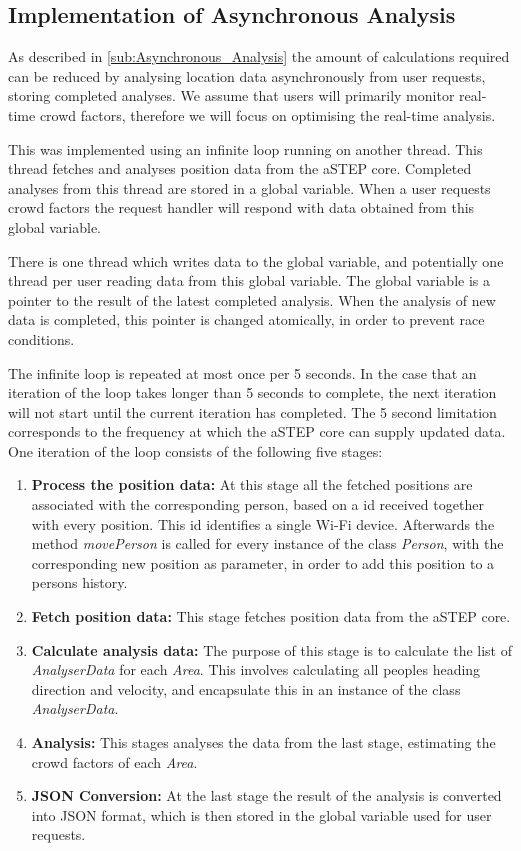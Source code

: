 \subsection{Implementation of Asynchronous Analysis}
\label{sub:implementation_of_asynchronous_analysis}

As described in \cref{sub:Asynchronous_Analysis} the amount of calculations required can be reduced by analysing location data asynchronously from user requests, storing completed analyses. We assume that users will primarily monitor real-time crowd factors, therefore we will focus on optimising the real-time analysis.

This was implemented using an infinite loop running on another thread. This thread fetches and analyses position data from the aSTEP core. Completed analyses from this thread are stored in a global variable. When a user requests crowd factors the request handler will respond with data obtained from this global variable. 

There is one thread which writes data to the global variable, and potentially one thread per user reading data from this global variable. The global variable is a pointer to the result of the latest completed analysis. When the analysis of new data is completed, this pointer is changed atomically, in order to prevent race conditions. 

The infinite loop is repeated at most once per 5 seconds. In the case that an iteration of the loop takes longer than 5 seconds to complete, the next iteration will not start until the current iteration has completed. The 5 second limitation corresponds to the frequency at which the aSTEP core can supply updated data. One iteration of the loop consists of the following five stages: 

\begin{enumerate}
    \item \textbf{Process the position data:} At this stage all the fetched positions are associated with the corresponding person, based on a id received together with every position. This id identifies a single Wi-Fi device. Afterwards the method \emph{movePerson} is called for every instance of the class \emph{Person}, with the corresponding new position as parameter, in order to add this position to a persons history.
    \item \textbf{Fetch position data:} This stage fetches position data from the aSTEP core.
    \item \textbf{Calculate analysis data:} The purpose of this stage is to calculate the list of \emph{AnalyserData} for each \emph{Area}. This involves calculating all peoples heading direction and velocity, and encapsulate this in an instance of the class \emph{AnalyserData}.
    \item \textbf{Analysis:} This stages analyses the data from the last stage, estimating the crowd factors of each \emph{Area}.
    \item \textbf{JSON Conversion:} At the last stage the result of the analysis is converted into JSON format, which is then stored in the global variable used for user requests. 
\end{enumerate}

